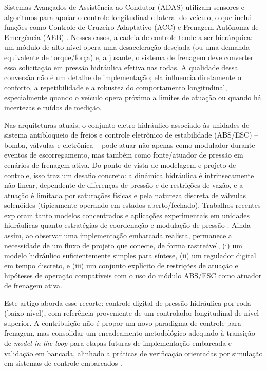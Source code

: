 \documentclass[a4paper]{ifacconf}
\begin{document}
Sistemas Avançados de Assistência ao Condutor (ADAS) utilizam sensores e algoritmos para apoiar o controle longitudinal e lateral do veículo, o que inclui funções como Controle de Cruzeiro Adaptativo (ACC) e Frenagem Autônoma de Emergência (AEB) \cite{Lentin2022}. Nesses casos, a cadeia de controle tende a ser hierárquica: um módulo de alto nível opera uma desaceleração desejada (ou uma demanda equivalente de torque/força) e, a jusante, o sistema de frenagem deve converter essa solicitação em pressão hidráulica efetiva nas rodas. A qualidade dessa conversão não é um detalhe de implementação; ela influencia diretamente o conforto, a repetibilidade e a robustez do comportamento longitudinal, especialmente quando o veículo opera próximo a limites de atuação ou quando há incertezas e ruídos de medição.

Nas arquiteturas atuais, o conjunto eletro-hidráulico associado às unidades de sistema antibloqueio de freios e controle eletrônico de estabilidade (ABS/ESC) -- bomba, válvulas e eletrônica -- pode atuar não apenas como modulador durante eventos de escorregamento, mas também como fonte/atuador de pressão em cenários de frenagem ativa. Do ponto de vista de modelagem e projeto de controle, isso traz um desafio concreto: a dinâmica hidráulica é intrinsecamente não linear, dependente de diferenças de pressão e de restrições de vazão, e a atuação é limitada por saturações físicas e pela natureza discreta de válvulas solenóides (tipicamente operando em estados aberto/fechado). Trabalhos recentes exploram tanto modelos concentrados e aplicações experimentais em unidades hidráulicas \cite{HouhuaJing2022,ZengYangHuang2023} quanto estratégias de coordenação e modulação de pressão \cite{Lv2014,ChenLv2017,PressureCoordinatedControl2023}. Ainda assim, ao observar uma implementação embarcada realista, permanece a necessidade de um fluxo de projeto que conecte, de forma rastreável, (i) um modelo hidráulico suficientemente simples para síntese, (ii) um regulador digital em tempo discreto, e (iii) um conjunto explícito de restrições de atuação e hipóteses de operação compatíveis com o uso do módulo ABS/ESC como atuador de frenagem ativa.

Este artigo aborda esse recorte: controle digital de pressão hidráulica por roda (baixo nível), com referência proveniente de um controlador longitudinal de nível superior. A contribuição não é propor um novo paradigma de controle para frenagem, mas consolidar um encadeamento metodológico adequado à transição de \textit{model-in-the-loop} para etapas futuras de implementação embarcada e validação em bancada, alinhado a práticas de verificação orientadas por simulação em sistemas de controle embarcados \cite{KapinskiJamesDeshmukh2016}.
\end{document}
